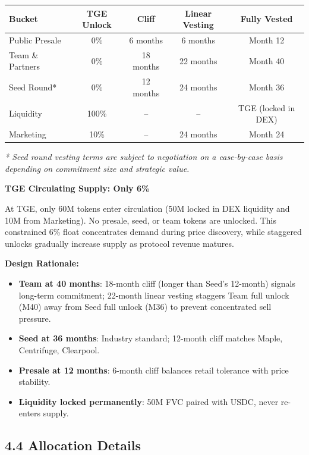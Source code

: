 \documentclass[
  paper=a4,
  ,captions=tableheading
]{scrartcl}
\providecommand{\tightlist}{%
  \setlength{\itemsep}{0pt}\setlength{\parskip}{0pt}}
\begin{document}
\begin{center}
\begin{tabular}{lcccc}
\toprule
\textbf{Bucket} & \textbf{TGE Unlock} & \textbf{Cliff} & \textbf{Linear Vesting} & \textbf{Fully Vested} \\
\midrule
Public Presale & 0\% & 6 months & 6 months & Month 12 \\
Team \& Partners & 0\% & 18 months & 22 months & Month 40 \\
Seed Round* & 0\% & 12 months & 24 months & Month 36 \\
Liquidity & 100\% & -- & -- & TGE (locked in DEX) \\
Marketing & 10\% & -- & 24 months & Month 24 \\
\bottomrule
\end{tabular}
\end{center}

\textit{* Seed round vesting terms are subject to negotiation on a case-by-case basis depending on commitment size and strategic value.}

\textbf{TGE Circulating Supply: Only 6\%}

At TGE, only 60M tokens enter circulation (50M locked in DEX liquidity and 10M from Marketing). No presale, seed, or team tokens are unlocked. This constrained 6\% float concentrates demand during price discovery, while staggered unlocks gradually increase supply as protocol revenue matures.

\textbf{Design Rationale:}

\begin{itemize}
\tightlist
\item
  \textbf{Team at 40 months}: 18-month cliff (longer than Seed's 12-month) signals long-term commitment; 22-month linear vesting staggers Team full unlock (M40) away from Seed full unlock (M36) to prevent concentrated sell pressure.
\item
  \textbf{Seed at 36 months}: Industry standard; 12-month cliff matches Maple, Centrifuge, Clearpool.
\item
  \textbf{Presale at 12 months}: 6-month cliff balances retail tolerance with price stability.
\item
  \textbf{Liquidity locked permanently}: 50M FVC paired with USDC, never re-enters supply.
\end{itemize}

\subsection{4.4 Allocation Details}\label{allocation-details}
\end{document}
